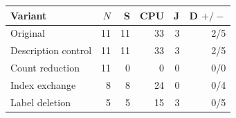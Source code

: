 \begin{tabular}{@{}lrrrrr@{}}
\toprule
Variant & $N$ & S & CPU & J & D $+/-$\\
\midrule
Original & 11 & 11 & 33 & 3 & 2/5 \\
Description control & 11 & 11 & 33 & 3 & 2/5 \\
Count reduction & 11 & 0 & 0 & 0 & 0/0 \\
Index exchange & 8 & 8 & 24 & 0 & 0/4 \\
Label deletion & 5 & 5 & 15 & 3 & 0/5 \\
\bottomrule
\end{tabular}
